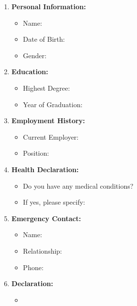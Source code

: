\documentclass{article}
\begin{document}
\begin{enumerate}[label=\textbf{\arabic*.}]
    \item \textbf{Personal Information:}
    \begin{itemize}
        \item Name: \TextField{}
        \item Date of Birth: \TextField{}
        \item Gender:   
    \end{itemize}
    
    \item \textbf{Education:}
    \begin{itemize}
        \item Highest Degree: \TextField{}
        \item Year of Graduation: \TextField{}
    \end{itemize}
    
    \item \textbf{Employment History:}
    \begin{itemize}
        \item Current Employer: \TextField{}
        \item Position: \TextField{}
    \end{itemize}
    
    \item \textbf{Health Declaration:}
    \begin{itemize}
        \item Do you have any medical conditions?   
        \item If yes, please specify: \TextField{}
    \end{itemize}
    
    \item \textbf{Emergency Contact:}
    \begin{itemize}
        \item Name: \TextField{}
        \item Relationship: \TextField{}
        \item Phone: \TextField{}
    \end{itemize}
    
    \item \textbf{Declaration:}
    \begin{itemize}
        \item  {}
    \end{itemize}
\end{enumerate}
\end{document}
